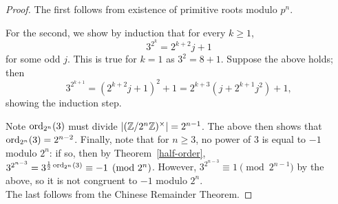 \begin{proof}
The first follows from existence of primitive roots modulo $p^n$.

%
%
For the second, we show by induction that for every $k\ge 1$,
\[
3^{2^k}=2^{k+2}j+1
\]
for some odd $j$. This is true for $k=1$ as $3^2=8+1$. Suppose the above holds; then
\[
3^{2^{k+1}}=(2^{k+2}j+1)^2+1=2^{k+3}(j+2^{k+1}j^2)+1,
\]
showing the induction step.

Note $\operatorname{ord}_{2^n}(3)$ must divide $|(\mathbb{Z}/2^n\mathbb{Z})^{\times}|=2^{n-1}$. The above then shows that $\operatorname{ord}_{2^n}(3)=2^{n-2}$. 
Finally, note that for $n\ge 3$, no power of 3 is equal to $-1$ modulo $2^n$: if so, then by Theorem~\ref{half-order}, $3^{2^{n-3}}=3^{\frac{1}{2}\operatorname{ord}_{2^n}(3)}\equiv -1\pmod{2^n}$. %
However, $3^{2^{n-3}}\equiv 1\pmod{2^{n-1}}$ by the above, so it is not congruent to $-1$ modulo $2^n$.\\

The last follows from the Chinese Remainder Theorem.
\end{proof}
